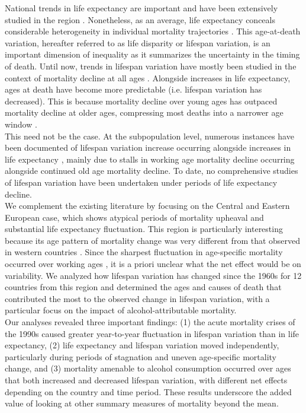 \documentclass{article}
\begin{document}
\begin{spacing}{1.5}
National trends in life expectancy are important and have been extensively studied in the region \citep{mesle2004mortality, mesle2000, rychtarikova2004case,shkolnikov2001,shkolnikov2006changing,leon2011}. Nonetheless, as an average, life expectancy conceals considerable heterogeneity in individual mortality trajectories \citep{edwards2005, wilmoth1999}. This age-at-death variation, hereafter referred to as life disparity or lifespan variation, is an important dimension of inequality as it summarizes the uncertainty in the timing of death. Until now, trends in lifespan variation have mostly been studied in the context of mortality decline at all ages \citep{edwards2005,smits2009,vaupel2011}. Alongside increases in life expectancy, ages at death have become more predictable (i.e. lifespan variation has decreased). This is because mortality decline over young ages has outpaced mortality decline at older ages, compressing most deaths into a narrower age window \citep{vaupel2011}.\\

This need not be the case. At the subpopulation level, numerous instances have been documented of lifespan variation increase occurring alongside increases in life expectancy \citep{vanraalte2014,sasson2016trends,seaman2016increasing, bronnum-hansen2017}, mainly due to stalls in working age mortality decline occurring alongside continued old age mortality decline. To date, no comprehensive studies of lifespan variation have been undertaken under periods of life expectancy decline.\\

We complement the existing literature by focusing on the Central and Eastern European case, which shows atypical periods of mortality upheaval and substantial life expectancy fluctuation. This region is particularly interesting because its age pattern of mortality change was very different from that observed in western countries \citep{mesle2004mortality}. Since the sharpest fluctuation in age-specific mortality occurred over working ages \citep{rehm2007}, it is a priori unclear what the net effect would be on variability. We analyzed how lifespan variation has changed since the 1960s for 12 countries from this region and determined the ages and causes of death that contributed the most to the observed change in lifespan variation, with a particular focus on the impact of alcohol-attributable mortality. \\

Our analyses revealed three important findings: (1) the acute mortality crises of the 1990s caused greater year-to-year fluctuation in lifespan variation than in life expectancy, (2) life expectancy and lifespan variation moved independently, particularly during periods of stagnation and uneven age-specific mortality change, and (3) mortality amenable to alcohol consumption occurred over ages that both increased and decreased lifespan variation, with different net effects depending on the country and time period. These results underscore the added value of looking at other summary measures of mortality beyond the mean.



\end{spacing}
\end{document}
